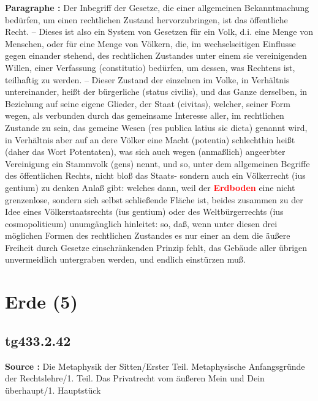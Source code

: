 \documentclass[a4paper,12pt,twoside]{book}
\newcommand{\match}[1]{\textcolor{red}{\textbf{#1}}}
\newcommand{\unnumberedsection}[1]{
	\section*{#1}
	\addcontentsline{toc}{section}{#1}
	\markright{#1}
}
\begin{document}
	\textbf{Paragraphe : }Der Inbegriff der Gesetze, die einer allgemeinen Bekanntmachung bedürfen, um einen rechtlichen Zustand hervorzubringen, ist das öffentliche Recht. – Dieses ist also ein System von Gesetzen für ein Volk, d.i. eine Menge von Menschen, oder für eine Menge von Völkern, die, im wechselseitigen Einflusse gegen einander stehend, des rechtlichen Zustandes unter einem sie vereinigenden Willen, einer Verfassung (constitutio) bedürfen, um dessen, was Rechtens ist, teilhaftig zu werden. – Dieser Zustand der einzelnen im Volke, in Verhältnis untereinander, heißt der bürgerliche (status civilis), und das Ganze derselben, in Beziehung auf seine eigene Glieder, der Staat (civitas), welcher, seiner Form wegen, als verbunden durch das gemeinsame Interesse aller, im rechtlichen Zustande zu sein, das gemeine Wesen (res publica latius sic dicta) genannt wird, in Verhältnis aber auf an dere Völker eine Macht (potentia) schlechthin heißt (daher das Wort Potentaten), was sich auch wegen (anmaßlich) angeerbter Vereinigung ein Stammvolk (gens) nennt, und so, unter dem allgemeinen Begriffe des öffentlichen Rechts, nicht bloß das Staats- sondern auch ein Völkerrecht (ius gentium) zu denken Anlaß gibt: welches dann, weil der \match{Erdboden} eine nicht grenzenlose, sondern sich selbst schließende Fläche ist, beides zusammen zu der Idee eines Völkerstaatsrechts (ius gentium) oder des Weltbürgerrechts (ius cosmopoliticum) unumgänglich hinleitet: so, daß, wenn unter diesen drei möglichen Formen des rechtlichen Zustandes es nur einer an dem die äußere Freiheit durch Gesetze einschränkenden Prinzip fehlt, das Gebäude aller übrigen unvermeidlich untergraben werden, und endlich einstürzen muß. 
	
	\unnumberedsection{Erde (5)} 
	\subsection*{tg433.2.42} 
	\textbf{Source : }Die Metaphysik der Sitten/Erster Teil. Metaphysische Anfangsgründe der Rechtslehre/1. Teil. Das Privatrecht vom äußeren Mein und Dein überhaupt/1. Hauptstück\\  
	
\end{document}
